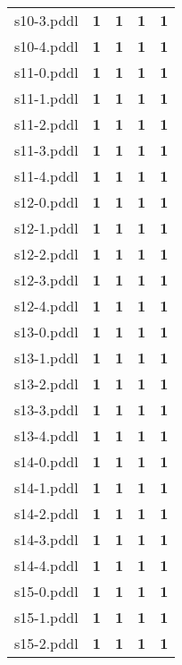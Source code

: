\documentclass{article}
\begin{document}
\begin{tabular}{@{}lrrrr@{}}
s10-3.pddl & \textbf{1} & \textbf{1} & \textbf{1} & \textbf{1} \\
s10-4.pddl & \textbf{1} & \textbf{1} & \textbf{1} & \textbf{1} \\
s11-0.pddl & \textbf{1} & \textbf{1} & \textbf{1} & \textbf{1} \\
s11-1.pddl & \textbf{1} & \textbf{1} & \textbf{1} & \textbf{1} \\
s11-2.pddl & \textbf{1} & \textbf{1} & \textbf{1} & \textbf{1} \\
s11-3.pddl & \textbf{1} & \textbf{1} & \textbf{1} & \textbf{1} \\
s11-4.pddl & \textbf{1} & \textbf{1} & \textbf{1} & \textbf{1} \\
s12-0.pddl & \textbf{1} & \textbf{1} & \textbf{1} & \textbf{1} \\
s12-1.pddl & \textbf{1} & \textbf{1} & \textbf{1} & \textbf{1} \\
s12-2.pddl & \textbf{1} & \textbf{1} & \textbf{1} & \textbf{1} \\
s12-3.pddl & \textbf{1} & \textbf{1} & \textbf{1} & \textbf{1} \\
s12-4.pddl & \textbf{1} & \textbf{1} & \textbf{1} & \textbf{1} \\
s13-0.pddl & \textbf{1} & \textbf{1} & \textbf{1} & \textbf{1} \\
s13-1.pddl & \textbf{1} & \textbf{1} & \textbf{1} & \textbf{1} \\
s13-2.pddl & \textbf{1} & \textbf{1} & \textbf{1} & \textbf{1} \\
s13-3.pddl & \textbf{1} & \textbf{1} & \textbf{1} & \textbf{1} \\
s13-4.pddl & \textbf{1} & \textbf{1} & \textbf{1} & \textbf{1} \\
s14-0.pddl & \textbf{1} & \textbf{1} & \textbf{1} & \textbf{1} \\
s14-1.pddl & \textbf{1} & \textbf{1} & \textbf{1} & \textbf{1} \\
s14-2.pddl & \textbf{1} & \textbf{1} & \textbf{1} & \textbf{1} \\
s14-3.pddl & \textbf{1} & \textbf{1} & \textbf{1} & \textbf{1} \\
s14-4.pddl & \textbf{1} & \textbf{1} & \textbf{1} & \textbf{1} \\
s15-0.pddl & \textbf{1} & \textbf{1} & \textbf{1} & \textbf{1} \\
s15-1.pddl & \textbf{1} & \textbf{1} & \textbf{1} & \textbf{1} \\
s15-2.pddl & \textbf{1} & \textbf{1} & \textbf{1} & \textbf{1} \\

\end{tabular}
\end{document}
